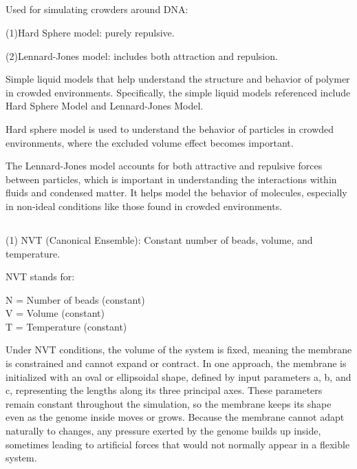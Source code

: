 \documentclass[12pt]{article}
\begin{document}
\begin{flushleft}
\subsection*{}

   \indent\indent Used for simulating crowders around DNA:

       \indent\indent (1)Hard Sphere model: purely repulsive.

      \indent\indent (2)Lennard-Jones model: includes both attraction and repulsion.
      
      
Simple liquid models that help understand the structure and behavior of polymer in crowded environments. Specifically, the simple liquid models referenced include Hard Sphere Model and Lennard-Jones Model. 

Hard sphere model is used to understand the behavior of particles in crowded environments, where the excluded volume effect becomes important. 

The Lennard-Jones model accounts for both attractive and repulsive forces between particles, which is important in understanding the interactions within fluids and condensed matter. It helps model the behavior of molecules, especially in non-ideal conditions like those found in crowded environments. 

\subsection*{}
(1) NVT (Canonical Ensemble): Constant number of beads, volume, and temperature.
   
  

\indent\indent NVT stands for:

 \indent\indent\indent  N = Number of beads (constant)\\

 \indent\indent\indent  V = Volume (constant)\\

 \indent\indent\indent  T = Temperature (constant)

Under NVT conditions, the volume of the system is fixed, meaning the membrane is constrained and cannot expand or contract. In one approach, the membrane is initialized with an oval or ellipsoidal shape, defined by input parameters a, b, and c, representing the lengths along its three principal axes. These parameters remain constant throughout the simulation, so the membrane keeps its shape even as the genome inside moves or grows. Because the membrane cannot adapt naturally to changes, any pressure exerted by the genome builds up inside, sometimes leading to artificial forces that would not normally appear in a flexible system.


\end{flushleft}
\end{document}

